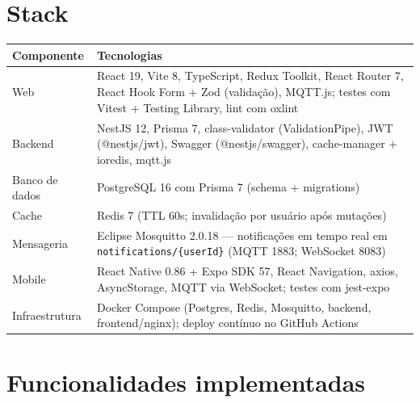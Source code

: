 \documentclass[11pt,a4paper]{article}
\begin{document}
\section{Stack}

\begin{tabularx}{\linewidth}{@{}l >{\raggedright\arraybackslash}X@{}}
  \toprule
  \textbf{Componente} & \textbf{Tecnologias} \\
  \midrule
  Web
    & React 19, Vite 8, TypeScript, Redux Toolkit, React Router 7,
      React Hook Form + Zod (validação), MQTT.js; testes com Vitest + Testing Library,
      lint com oxlint \\
  Backend
    & NestJS 12, Prisma 7, class-validator (ValidationPipe), JWT
      (@nestjs/jwt), Swagger (@nestjs/swagger), cache-manager + ioredis, mqtt.js \\
  Banco de dados & PostgreSQL 16 com Prisma 7 (schema + migrations) \\
  Cache & Redis 7 (TTL 60s; invalidação por usuário após mutações) \\
  Mensageria & Eclipse Mosquitto 2.0.18 --- notificações em tempo real
      em \texttt{notifications/\{userId\}} (MQTT 1883; WebSocket 8083) \\
  Mobile & React Native 0.86 + Expo SDK 57, React Navigation, axios,
      AsyncStorage, MQTT via WebSocket; testes com jest-expo \\
  Infraestrutura & Docker Compose (Postgres, Redis, Mosquitto, backend, frontend/nginx);
      deploy contínuo no GitHub Actions \\
  \bottomrule
\end{tabularx}

\section{Funcionalidades implementadas}
\end{document}

